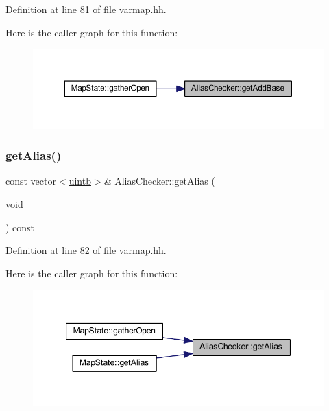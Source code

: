 Definition at line 81 of file varmap.\+hh.

Here is the caller graph for this function\+:
\nopagebreak
\begin{figure}[H]
\begin{center}
\leavevmode
\includegraphics[width=350pt]{class_alias_checker_af5696485bdbe41dd637ccb8987fa5303_icgraph}
\end{center}
\end{figure}
\mbox{\label{class_alias_checker_a3f531ba115361825fa5e38c5daf7d63d}} 
\subsubsection{\texorpdfstring{getAlias()}{getAlias()}}
{\footnotesize\ttfamily const vector$<$\mbox{\hyperlink{types_8h_a2db313c5d32a12b01d26ac9b3bca178f}{uintb}}$>$\& Alias\+Checker\+::get\+Alias (\begin{DoxyParamCaption}\item[{void}]{ }\end{DoxyParamCaption}) const\hspace{0.3cm}{\ttfamily [inline]}}



Definition at line 82 of file varmap.\+hh.

Here is the caller graph for this function\+:
\nopagebreak
\begin{figure}[H]
\begin{center}
\leavevmode
\includegraphics[width=347pt]{class_alias_checker_a3f531ba115361825fa5e38c5daf7d63d_icgraph}
\end{center}
\end{figure}
\mbox{\label{class_alias_checker_a2bcaccaa3b0553741c68abf06115e113}} 
